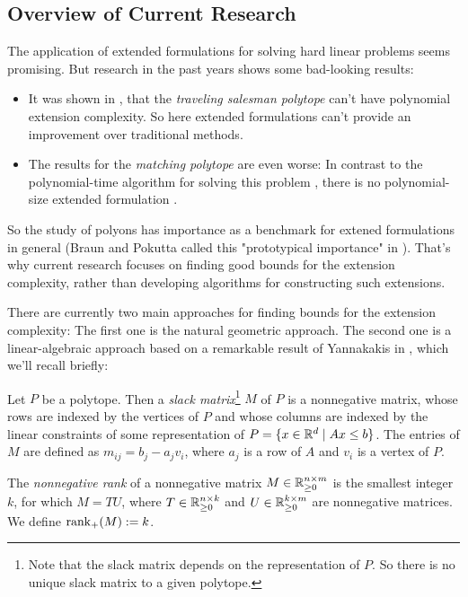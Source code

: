 \subsection{Overview of Current Research}

The application of extended formulations for solving hard linear problems seems promising. But research in the past years shows some bad-looking results:
\begin{itemize}
  \item It was shown in \cite{fiorini2015exponential}, that the \emph{traveling salesman polytope} can't have polynomial extension complexity. So here extended formulations can't provide an improvement over traditional methods.
  \item The results for the \emph{matching polytope} are even worse: In contrast to the polynomial-time algorithm for solving this problem \cite{ford1956maximal}, there is no polynomial-size extended formulation \cite{rothvoss2017matching}.
\end{itemize}

So the study of polyons has importance as a benchmark for extened formulations in general (Braun and Pokutta called this "prototypical importance" in \cite{braun2015matching}).
That's why current research focuses on finding good bounds for the extension complexity, rather than developing algorithms for constructing such extensions.

There are currently two main approaches for finding bounds for the extension complexity: The first one is the natural geometric approach. The second one is a linear-algebraic approach based on a remarkable result of Yannakakis in \cite{yannakakis1991expressing}, which we'll recall briefly:

\begin{definition}
  Let $P$ be a polytope.
  Then a \emph{slack matrix}\footnote{Note that the slack matrix depends on the representation of $P$. So there is no unique slack matrix to a given polytope.} $M$ of $P$ is a nonnegative matrix, whose rows are indexed by the vertices of $P$ and whose columns are indexed by the linear constraints of some representation of $P=\{x \in \mathbb{R}^d \mid Ax \leq b\}$. 
  The entries of $M$ are defined as $m_{ij} = b_j - a_j v_i$, where $a_j$ is a row of $A$ and $v_i$ is a vertex of $P$.
\end{definition}

\begin{definition}
  The \emph{nonnegative rank} of a nonnegative matrix $M \in \mathbb{R}_{\geq 0}^{n \times m}$ is the smallest integer $k$, for which $M = TU$, where $T \in \mathbb{R}_{\geq 0}^{n \times k}$ and $U \in \mathbb{R}_{\geq 0}^{k \times m}$ are nonnegative matrices.
  We define $\operatorname{rank}_+(M) := k$.
\end{definition}

